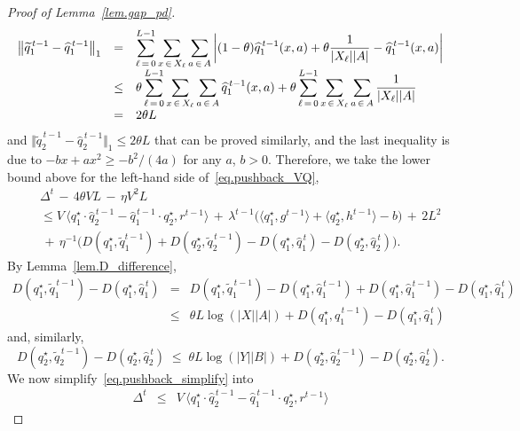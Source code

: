 \documentclass[12pt, final]{l4dc2023}
\begin{document}
\begin{proof}[Proof of Lemma~\ref{lem.gap_pd}]
	\[
	\begin{array}{rcl}
	\left\|{ \widetilde q_1^{\,t-1}- \widehat q_1^{\,t-1}}\right\|_1 
	&=& \displaystyle\sum_{\ell\,=\,0}^{L-1}\sum_{x\,\in\,X_\ell}\sum_{a\,\in\,A}\left| (1-\theta)\widehat {q}_1^{\,t-1}(x,a)+\theta\frac{1}{|X_\ell||A|}-\widehat q_1^{\,t-1}(x,a) \right|
	\\[0.2cm]
	&\leq& \displaystyle \theta\sum_{\ell\,=\,0}^{L-1}\sum_{x\,\in\,X_\ell}\sum_{a\,\in\,A} \widehat {q}_1^{\,t-1}(x,a)+\theta\sum_{\ell\,=\,0}^{L-1}\sum_{x\,\in\,X_\ell}\sum_{a\,\in\,A}\frac{1}{|X_\ell||A|}
	\\[0.2cm]
	&=& 2\theta L
	\end{array}
	\]
	and $\Vert{ \tilde q_2^{\,t-1}- \hat q_2^{\,t-1}}\Vert_1 \leq 2\theta L$ that can be proved similarly, and the last inequality is due to 
	$-bx+ax^2\geq - b^2/(4a)$ for any $a$, $b > 0$. Therefore, we take the lower bound above for the left-hand side of~\eqref{eq.pushback_VQ},
	\begin{equation}\label{eq.pushback_simplify}
	\begin{array}{rcl}
	&& \!\!\!\!\!\! 
	\Delta^{t} \,-\,4\theta V L\,-\,\eta V^2 L
	\\[0.2cm]
	&& \!\!\!\!\!\! \leq V\, \big\langle{ q_1^\star\cdot \hat q_2^{\,t-1}-\hat q_1^{\,t-1}\cdot  q_2^\star },{r^{t-1}}\big\rangle 
	\,+\,
	\lambda^{t-1} \big(\langle{ q_1^\star},{g^{t-1}}\rangle 
	+ \langle{ q_2^\star},{h^{t-1}}\rangle -b\big)
	\,+\,2L^2
	\\[0.2cm]
	&& \,+\, \eta^{-1} \big(D( q_1^\star,\tilde q_1^{t-1}) + D( q_2^\star, \tilde q_2^{\,t-1}) -D( q_1^\star,\hat q_1^{\,t}) - D( q_2^\star, \hat q_2^{\,t}) \big).
	\end{array}
	\end{equation}
	By Lemma~\ref{lem.D_difference},
	\[
	\begin{array}{rcl}
	D( q_1^\star,\tilde q_1^{\,t-1}) - D( q_1^\star,\hat q_1^{\,t}) &=& D( q_1^\star,\tilde q_1^{\,t-1}) - D( q_1^\star,\hat q_1^{\,t-1})  + D( q_1^\star,\hat q_1^{\,t-1}) - D( q_1^\star,\hat q_1^{\,t}) 
	\\[0.2cm]
	&\leq & \theta L\log (|X||A|)+ D( q_1^\star,\hat q_1^{\,t-1}) - D( q_1^\star,\hat q_1^{\,t}) 
	\end{array}
	\]
	and, similarly, 
	\[
	D( q_2^\star, \tilde q_2^{\,t-1})  - D( q_2^\star, \hat q_2^{\,t}) \;\leq\; \theta L\log (|Y||B|)+ D( q_2^\star,\hat q_2^{\,t-1}) - D( q_2^\star,\hat q_2^{\,t}). 
	\]
	We now simplify~\eqref{eq.pushback_simplify} into
	\[
	\begin{array}{rcl}
	\Delta^{t} 
	&\leq&  V\, \big\langle{ q_1^\star\cdot \hat q_2^{\,t-1}-\hat q_1^{\,t-1}\cdot  q_2^\star },{r^{t-1}}\big\rangle 

\end{array}\]
\end{proof}
\end{document}
